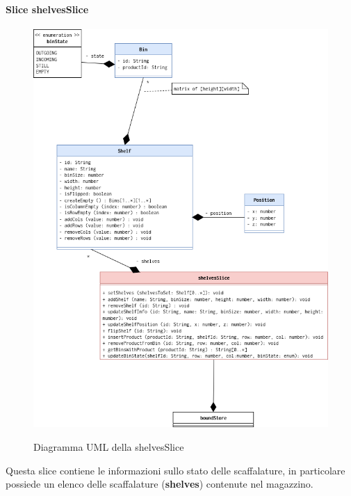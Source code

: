 \paragraph{Slice shelvesSlice}
\begin{figure}[H]
    \centering
    \includegraphics[width=\textwidth]{images/UML/feature_model_shelvesSlice.drawio.png}
    \label{fig:UML_shelvesSlice}
    \caption{Diagramma UML della shelvesSlice}
\end{figure}
Questa slice contiene le informazioni sullo stato delle scaffalature, in particolare possiede un elenco delle scaffalature (\textbf{shelves}) contenute nel magazzino. 

